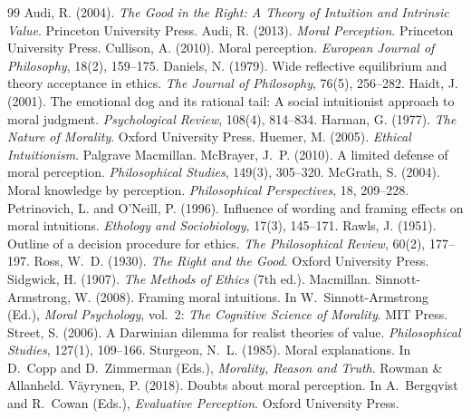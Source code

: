 \documentclass{situationist-preprint}
\begin{document}
\begin{thebibliography}{99}\small
{} Audi, R. (2004). \emph{The Good in the Right: A Theory of Intuition and Intrinsic Value}. Princeton University Press.
 Audi, R. (2013). \emph{Moral Perception}. Princeton University Press.
 Cullison, A. (2010). Moral perception. \emph{European Journal of Philosophy}, 18(2), 159--175.
 Daniels, N. (1979). Wide reflective equilibrium and theory acceptance in ethics. \emph{The Journal of Philosophy}, 76(5), 256--282.
 Haidt, J. (2001). The emotional dog and its rational tail: A social intuitionist approach to moral judgment. \emph{Psychological Review}, 108(4), 814--834.
 Harman, G. (1977). \emph{The Nature of Morality}. Oxford University Press.
 Huemer, M. (2005). \emph{Ethical Intuitionism}. Palgrave Macmillan.
 McBrayer, J.~P. (2010). A limited defense of moral perception. \emph{Philosophical Studies}, 149(3), 305--320.
 McGrath, S. (2004). Moral knowledge by perception. \emph{Philosophical Perspectives}, 18, 209--228.
 Petrinovich, L. and O'Neill, P. (1996). Influence of wording and framing effects on moral intuitions. \emph{Ethology and Sociobiology}, 17(3), 145--171.
 Rawls, J. (1951). Outline of a decision procedure for ethics. \emph{The Philosophical Review}, 60(2), 177--197.
 Ross, W.~D. (1930). \emph{The Right and the Good}. Oxford University Press.
 Sidgwick, H. (1907). \emph{The Methods of Ethics} (7th ed.). Macmillan.
 Sinnott-Armstrong, W. (2008). Framing moral intuitions. In W.~Sinnott-Armstrong (Ed.), \emph{Moral Psychology}, vol.~2: \emph{The Cognitive Science of Morality}. MIT Press.
 Street, S. (2006). A Darwinian dilemma for realist theories of value. \emph{Philosophical Studies}, 127(1), 109--166.
 Sturgeon, N.~L. (1985). Moral explanations. In D.~Copp and D.~Zimmerman (Eds.), \emph{Morality, Reason and Truth}. Rowman \& Allanheld.
 V{\"a}yrynen, P. (2018). Doubts about moral perception. In A.~Bergqvist and R.~Cowan (Eds.), \emph{Evaluative Perception}. Oxford University Press.
\end{thebibliography}
\end{document}
